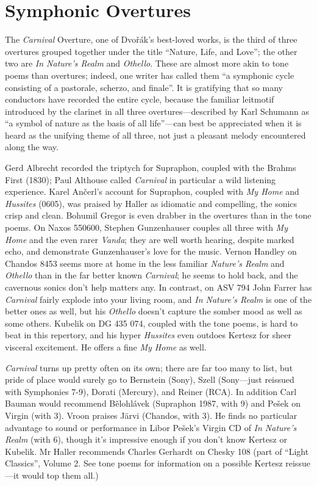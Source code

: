 \documentclass[12pt]{article}%
\begin{document}
\section{Symphonic Overtures}

The {\it Carnival} Overture, one of Dvořák's best-loved works, is the third of three overtures grouped together under the title ``Nature, Life, and Love''; the other two are {\it In Nature's Realm} and {\it Othello}. These are almost more akin to tone poems than overtures; indeed, one writer has called them ``a symphonic cycle consisting of a pastorale, scherzo, and finale''. It is gratifying that so many conductors have recorded the entire cycle, because the familiar leitmotif introduced by the clarinet in all three overtures---described by Karl Schumann as ``a symbol of nature as the basis of all life''---can best be appreciated when it is heard as the unifying theme of all three, not just a pleasant melody encountered along the way.

Gerd Albrecht recorded the triptych for Supraphon, coupled with the Brahms First
(1830); Paul Althouse called {\it Carnival} in particular a wild listening experience. Karel Ančerl's account for Supraphon, coupled with {\it My Home} and {\it Hussites} (0605), was praised by Haller as idiomatic and compelling, the sonics crisp and clean. Bohumil Gregor is even drabber in the overtures than in the tone poems.
On Naxos 550600, Stephen Gunzenhauser couples all three with {\it My Home} and the even rarer {\it Vanda}; they are well worth hearing, despite marked echo, and demonstrate Gunzenhauser's love for the music. Vernon Handley on Chandos 8453 seems more at home in the less familiar {\it Nature's Realm} and {\it Othello} than in the far better known {\it Carnival}; he seems to hold back, and the cavernous sonics don't help matters any. In contrast, on ASV 794 John Farrer has {\it Carnival } fairly explode into your living room, and {\it In Nature's Realm} is one of the better ones as well, but his {\it Othello} doesn't capture the somber mood as well as some others. Kubelik on DG 435 074, coupled with the tone poems, is hard to beat in this repertory, and his hyper {\it Hussites} even outdoes Kertesz for sheer visceral excitement. He offers a fine {\it My Home} as well.

{\it Carnival} turns up pretty often on its own; there are far too many to list, but pride of place would surely go to Bernstein (Sony), Szell (Sony---just reissued with Symphonies 7-9), Dorati (Mercury), and Reiner (RCA). In addition Carl Bauman would recommend Bělohlávek (Supraphon 1987, with 9) and Pešek on Virgin (with 3). Vroon praises Järvi (Chandos, with 3). He finds no particular advantage to sound or performance in Libor Pešek's Virgin CD of {\it In Nature's Realm} (with
6), though it's impressive enough if you don't know Kertesz or Kubelik. Mr Haller recommends Charles Gerhardt on Chesky 108 (part of ``Light Classics'', Volume 2. See tone poems for information on a possible Kertesz reissue---it would top them all.)
\end{document}
